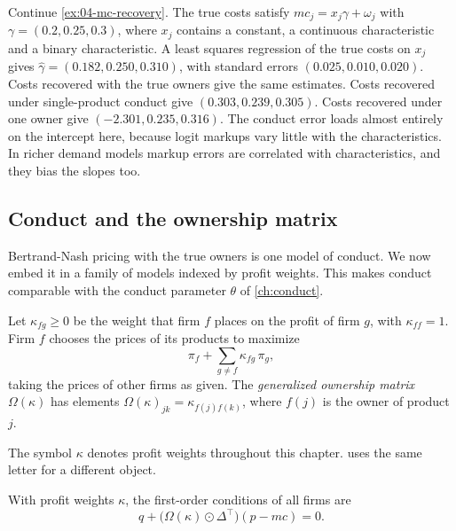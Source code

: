 \begin{example}\label{ex:04-cost-regression}
Continue \cref{ex:04-mc-recovery}. The true costs satisfy $mc_j = x_j\gamma + \omega_j$ with $\gamma = (0.2,
0.25, 0.3)$, where $x_j$ contains a constant, a continuous characteristic and a binary characteristic. A least
squares regression of the true costs on $x_j$ gives $\hat\gamma = (0.182, 0.250, 0.310)$, with standard errors
$(0.025, 0.010, 0.020)$. Costs recovered with the true owners give the same estimates. Costs recovered under
single-product conduct give $(0.303, 0.239, 0.305)$. Costs recovered under one owner give $(-2.301, 0.235, 0.316)$.
The conduct error loads almost entirely on the intercept here, because logit markups vary little with the
characteristics. In richer demand models markup errors are correlated with characteristics, and they bias the
slopes too.
\end{example}

\subsection{Conduct and the ownership matrix}\label{sec:04-conduct}

Bertrand-Nash pricing with the true owners is one model of conduct. We now embed it in a family of models
indexed by profit weights. This makes conduct comparable with the conduct parameter $\theta$ of
\cref{ch:conduct}.

\begin{definition}\label{def:04-profit-weights}
Let $\kappa_{fg} \ge 0$ be the weight that firm $f$ places on the profit of firm $g$, with $\kappa_{ff} = 1$.
Firm $f$ chooses the prices of its products to maximize
\begin{equation}\label{eq:04-kappa-objective}
\pi_f + \sum_{g \neq f}\kappa_{fg}\,\pi_g ,
\end{equation}
taking the prices of other firms as given. The \emph{generalized ownership matrix} $\Omega(\kappa)$ has elements
$\Omega(\kappa)_{jk} = \kappa_{f(j)f(k)}$, where $f(j)$ is the owner of product $j$.
\end{definition}

The symbol $\kappa$ denotes profit weights throughout this chapter.  uses the same letter for a
different object.

\begin{lemma}\label{lem:04-kappa-foc}
With profit weights $\kappa$, the first-order conditions of all firms are
\begin{equation}\label{eq:04-foc-kappa}
q + \big(\Omega(\kappa) \odot \Delta^\top\big)(p - mc) = 0 .
\end{equation}
\end{lemma}

